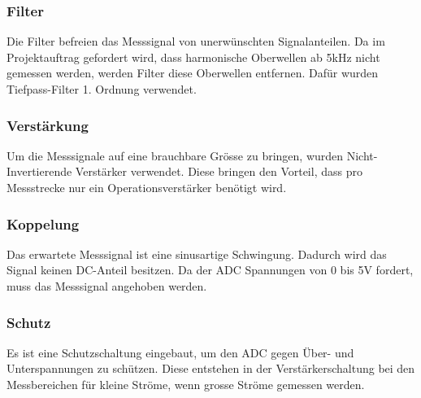 \subsubsection*{Filter}
Die Filter befreien das Messsignal von unerwünschten Signalanteilen. Da im Projektauftrag gefordert wird, dass harmonische Oberwellen ab 5kHz nicht gemessen werden, werden Filter diese Oberwellen entfernen. Dafür wurden Tiefpass-Filter 1. Ordnung verwendet.
\subsubsection*{Verstärkung}
Um die Messsignale auf eine brauchbare Grösse zu bringen, wurden Nicht-Invertierende Verstärker verwendet. Diese bringen den Vorteil, dass pro Messstrecke nur ein Operationsverstärker benötigt wird.
\subsubsection*{Koppelung}
Das erwartete Messsignal ist eine sinusartige Schwingung. Dadurch wird das Signal keinen DC-Anteil besitzen. Da der ADC Spannungen von 0 bis 5V fordert, muss das Messsignal angehoben werden.
\subsubsection*{Schutz}
Es ist eine Schutzschaltung eingebaut, um den ADC gegen Über- und Unterspannungen zu schützen. Diese entstehen in der Verstärkerschaltung bei den Messbereichen für kleine Ströme, wenn grosse Ströme gemessen werden.

\pagebreak